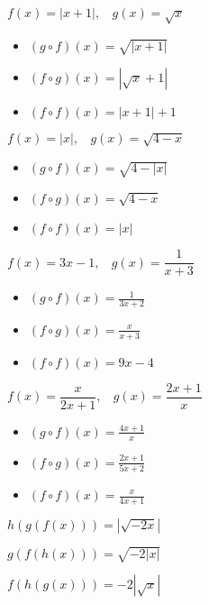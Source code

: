 \documentclass[12pt]{book}
\theoremstyle{definition}
\begin{document}
\begin{oddenumerate}
\item $f(x)=|x+1|,~~~~g(x)=\sqrt{x}$
\begin{multicols}{3}
\begin{itemize}
\item  $(g\circ f)(x)=\sqrt{|x+1|}$
\item  $(f\circ g)(x)=|\sqrt{x}+1|$
\item  $(f\circ f)(x)=|x+1|+1$
\end{itemize}
\end{multicols}

\item $f(x)=|x|,~~~~g(x)=\sqrt{4-x}$
\begin{multicols}{3}
\begin{itemize}
\item  $(g\circ f)(x)=\sqrt{4-|x|}$
\item  $(f\circ g)(x)=\sqrt{4-x}$
\item  $(f\circ f)(x)=|x|$
\end{itemize}
\end{multicols}

\item $f(x)=3x-1,~~~~g(x)=\dfrac{1}{x+3}$
\begin{multicols}{3}
\begin{itemize}
\item  $(g\circ f)(x)=\frac{1}{3x+2}$
\item  $(f\circ g)(x)=\frac{x}{x+3}$
\item  $(f\circ f)(x)=9x-4$
\end{itemize}
\end{multicols}

\item $f(x)=\dfrac{x}{2x+1},~~~~g(x)=\dfrac{2x+1}{x}$
\begin{multicols}{3}
\begin{itemize}
\item  $(g\circ f)(x)=\frac{4x+1}{x}$
\item  $(f\circ g)(x)=\frac{2x+1}{5x+2}$
\item  $(f\circ f)(x)=\frac{x}{4x+1}$
\end{itemize}
\end{multicols}

\item $h(g(f(x)))=|\sqrt{-2x}|$
\item $g(f(h(x)))=\sqrt{-2|x|}$
\item $f(h(g(x)))=-2|\sqrt{x}|$


\end{oddenumerate}
\end{document}
